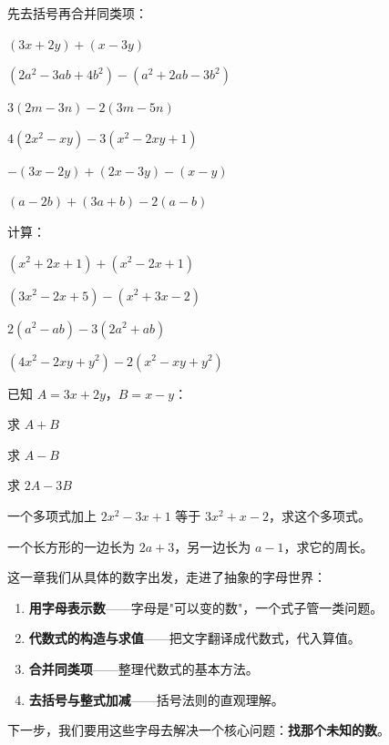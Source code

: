\begin{exercise}
\item 先去括号再合并同类项：
  \begin{subexercise}
    \item $(3x+2y)+(x-3y)$
    \item $(2a^2-3ab+4b^2)-(a^2+2ab-3b^2)$
    \item $3(2m-3n)-2(3m-5n)$
    \item $4(2x^2-xy)-3(x^2-2xy+1)$
    \item $-(3x-2y)+(2x-3y)-(x-y)$
    \item $(a-2b)+(3a+b)-2(a-b)$
  \end{subexercise}

\item 计算：
  \begin{subexercise}
    \item $(x^2+2x+1)+(x^2-2x+1)$
    \item $(3x^2-2x+5)-(x^2+3x-2)$
    \item $2(a^2-ab)-3(2a^2+ab)$
    \item $(4x^2-2xy+y^2)-2(x^2-xy+y^2)$
  \end{subexercise}

\item 已知 $A=3x+2y$，$B=x-y$：
  \begin{subexercise}
    \item 求 $A+B$
    \item 求 $A-B$
    \item 求 $2A-3B$
  \end{subexercise}

\item 一个多项式加上 $2x^2-3x+1$ 等于 $3x^2+x-2$，求这个多项式。

\item 一个长方形的一边长为 $2a+3$，另一边长为 $a-1$，求它的周长。
\end{exercise}


这一章我们从具体的数字出发，走进了抽象的字母世界：

\begin{enumerate}
  \item \textbf{用字母表示数}——字母是"可以变的数"，一个式子管一类问题。
  \item \textbf{代数式的构造与求值}——把文字翻译成代数式，代入算值。
  \item \textbf{合并同类项}——整理代数式的基本方法。
  \item \textbf{去括号与整式加减}——括号法则的直观理解。
\end{enumerate}

下一步，我们要用这些字母去解决一个核心问题：\textbf{找那个未知的数}。
